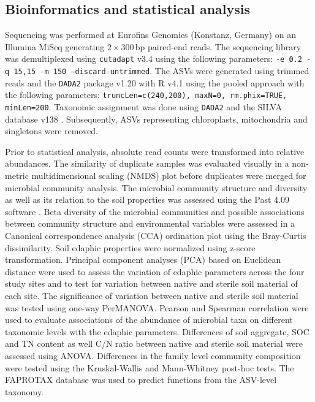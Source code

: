 \subsection{Bioinformatics and statistical analysis}

Sequencing was performed at Eurofins Genomics (Konstanz, Germany) on an Illumina MiSeq generating \(2\times 300\)\,bp paired-end reads. 
The sequencing library was demultiplexed using \texttt{cutadapt} v3.4 \citep{Martin2011} using the following parameters: \texttt{-e 0.2 -q 15,15 -m 150 --discard-untrimmed}. 
The ASVs were generated using trimmed reads and the \texttt{DADA2} package v1.20 \citep{Callahan2016} with R v4.1 using the pooled approach with the following parameters: \texttt{truncLen=c(240,200), maxN=0, rm.phix=TRUE, minLen=200}. 
Taxonomic assignment was done using \texttt{DADA2} and the SILVA database v138 \citep{Quast2012}. 
Subsequently, ASVs representing chloroplasts, mitochondria and singletons were removed.

Prior to statistical analysis, absolute read counts were transformed into relative abundances. 
The similarity of duplicate samples was evaluated visually in a non-metric multidimensional scaling (NMDS) plot before duplicates were merged for microbial community analysis. 
The microbial community structure and diversity as well as its relation to the soil properties was assessed using the Past 4.09 software \citep{Hammer2001}. 
Beta diversity of the microbial communities and possible associations between community structure and environmental variables were assessed in a Canonical correspondence analysis (CCA) ordination plot using the Bray-Curtis dissimilarity. 
Soil edaphic properties were normalized using z-score transformation. 
Principal component analyses (PCA) based on Euclidean distance were used to assess the variation of edaphic parameters across the four study sites and to test for variation between native and sterile soil material of each site. 
The significance of variation between native and sterile soil material was tested using one-way PerMANOVA. 
Pearson and Spearman correlation were used to evaluate associations of the abundance of microbial taxa on different taxonomic levels with the edaphic parameters. 
Differences of soil aggregate, SOC and TN content as well C/N ratio between native and sterile soil material were assessed using ANOVA. 
Differences in the family level community composition were tested using the Kruskal-Wallis and Mann-Whitney post-hoc tests. 
The FAPROTAX database \citep{Louca2016} was used to predict functions from the ASV-level taxonomy.

